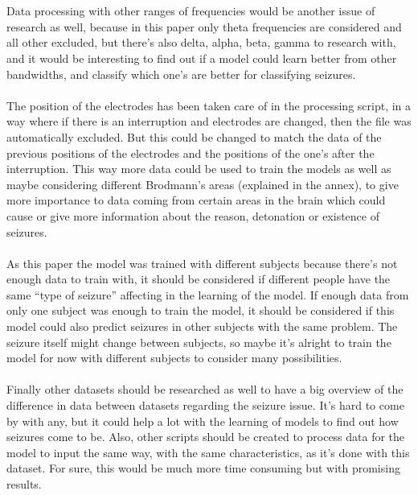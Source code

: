 \\\\
Data processing with other ranges of frequencies would be another issue of research as well, because in this paper only theta frequencies are considered and all other excluded, but there’s also delta, alpha, beta, gamma to research with, and it would be interesting to find out if a model could learn better from other bandwidths, and classify which one’s are better for classifying seizures.
\\\\
The position of the electrodes has been taken care of in the processing script, in a way where if there is an interruption and electrodes are changed, then the file was automatically excluded. But this could be changed to match the data of the previous positions of the electrodes and the positions of the one’s after the interruption. This way more data could be used to train the models as well as maybe considering different Brodmann’s areas (explained in the annex), to give more importance to data coming from certain areas in the brain which could cause or give more information about the reason, detonation or existence of seizures.
\\\\
As this paper the model was trained with different subjects because there’s not enough data to train with, it should be considered if different people have the same “type of seizure” affecting in the learning of the model. If enough data from only one subject was enough to train the model, it should be considered if this model could also predict seizures in other subjects with the same problem. The seizure itself might change between subjects, so maybe it’s alright to train the model for now with different subjects to consider many possibilities. 
\\\\
Finally other datasets should be researched as well to have a big overview of the difference in data between datasets regarding the seizure issue. It’s hard to come by with any, but it could help a lot with the learning of models to find out how seizures come to be. Also, other scripts should be created to process data for the model to input the same way, with the same characteristics, as it’s done with this dataset. For sure, this would be much more time consuming but with promising results.
\\

